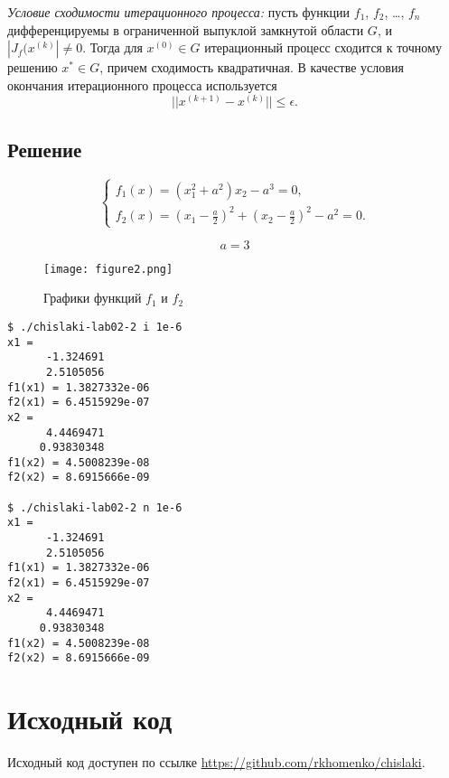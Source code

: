 \documentclass[a4paper,12pt]{article}
\begin{document}
\textit{Условие сходимости итерационного процесса:} пусть
функции $f_1$, $f_2$, \ldots, $f_n$ дифференцируемы в ограниченной
выпуклой замкнутой области $G$, и $|J_f(x^{(k)}| \not = 0$. Тогда
для $x^{(0)} \in G$ итерационный процесс сходится к точному решению
$x^{*} \in G$, причем сходимость квадратичная. В качестве условия окончания итерационного
процесса используется
$$
||x^{(k + 1)} -x^{(k)}|| \leq \epsilon.
$$

\subsection{Решение}
$$
\left\{
    \begin{array}{l}
        f_1(x) = (x_1^2 + a^2) x_2 - a^3 = 0, \\
        f_2(x) = (x_1 - \frac{a}{2})^2 + (x_2 - \frac{a}{2})^2 - a^ 2 = 0.
    \end{array}
    \right.
$$

$$
a = 3
$$

\begin{figure}[htbp]
  \centering
  \texttt{[image: figure2.png]}
  \caption{Графики функций $f_1$ и $f_2$}
\end{figure}

\begin{verbatim}
$ ./chislaki-lab02-2 i 1e-6
x1 =
      -1.324691
      2.5105056
f1(x1) = 1.3827332e-06
f2(x1) = 6.4515929e-07
x2 =
      4.4469471
     0.93830348
f1(x2) = 4.5008239e-08
f2(x2) = 8.6915666e-09

$ ./chislaki-lab02-2 n 1e-6
x1 =
      -1.324691
      2.5105056
f1(x1) = 1.3827332e-06
f2(x1) = 6.4515929e-07
x2 =
      4.4469471
     0.93830348
f1(x2) = 4.5008239e-08
f2(x2) = 8.6915666e-09
\end{verbatim}


\newpage

\section{Исходный код}
Исходный код доступен по ссылке
\url{https://github.com/rkhomenko/chislaki}.






\end{document}
